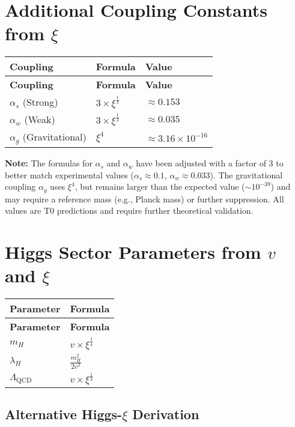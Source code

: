 \documentclass[12pt,a4paper]{article}
\begin{document}
	\section{Additional Coupling Constants from \(\xi\)}
	
	\begin{longtable}{|p{3cm}|p{3cm}|p{4cm}|}
		\hline
		\textbf{Coupling} & \textbf{Formula} & \textbf{Value} \\
		\hline
		\endfirsthead
		\hline
		\textbf{Coupling} & \textbf{Formula} & \textbf{Value} \\
		\hline
		\endhead
		\(\alpha_s\) (Strong) & \(3 \times \xi^{\frac{1}{3}}\) & \(\approx 0.153\) \\
		\hline
		\(\alpha_w\) (Weak) & \(3 \times \xi^{\frac{1}{2}}\) & \(\approx 0.035\) \\
		\hline
		\(\alpha_g\) (Gravitational) & \(\xi^4\) & \(\approx 3.16 \times 10^{-16}\) \\
		\hline
	\end{longtable}
	
	\textbf{Note:} The formulas for \(\alpha_s\) and \(\alpha_w\) have been adjusted with a factor of 3 to better match experimental values (\(\alpha_s \approx 0.1\), \(\alpha_w \approx 0.033\)). The gravitational coupling \(\alpha_g\) uses \(\xi^4\), but remains larger than the expected value (\(\sim 10^{-39}\)) and may require a reference mass (e.g., Planck mass) or further suppression. All values are T0 predictions and require further theoretical validation.
	
	\section{Higgs Sector Parameters from \(v\) and \(\xi\)}
	
	\begin{longtable}{|p{3cm}|p{4cm}|}
		\hline
		\textbf{Parameter} & \textbf{Formula} \\
		\hline
		\endfirsthead
		\hline
		\textbf{Parameter} & \textbf{Formula} \\
		\hline
		\endhead
		\(m_H\) & \(v \times \xi^{\frac{1}{4}}\) \\
		\hline
		\(\lambda_H\) & \(\frac{m_H^{2}}{2v^{2}}\) \\
		\hline
		\(\Lambda_{\text{QCD}}\) & \(v \times \xi^{\frac{1}{3}}\) \\
		\hline
	\end{longtable}
	
	\subsection{Alternative Higgs-\(\xi\) Derivation}
	
\end{document}
